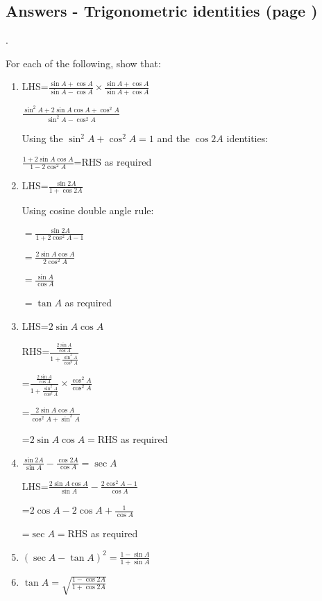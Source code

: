 \documentclass[../main.tex]{subfiles}
\begin{document}
\subsection*{Answers - Trigonometric identities (page \pageref{Trig identities})}
\label{Trig identities answers}.

For each of the following, show that:
\begin{enumerate}
    \item LHS=$\frac{\sin{A}+\cos{A}}{\sin{A}-\cos{A}}\times \frac{\sin{A}+\cos{A}}{\sin{A}+\cos{A}}$

    $\frac{\sin^2{A}+2\sin{A}\cos{A}+\cos^2{A}}{\sin^2{A}-\cos^2{A}}$

    Using the $\sin^2{A}+\cos^2{A}=1$ and the $\cos{2A}$ identities:

    $\frac{1+2\sin{A}\cos{A}}{1-2\cos^2{A}}$=RHS as required


    \item LHS=$\frac{\sin{2A}}{1+\cos{2A}}$

    Using cosine double angle rule:

    $=\frac{\sin{2A}}{1+2\cos^2{A}-1}$

    $=\frac{2\sin{A}\cos{A}}{2\cos^2{A}}$

    $=\frac{\sin{A}}{\cos{A}}$

    $=\tan{A}$ as required

    
    \item LHS=$2\sin{A}\cos{A}$

    RHS=$\frac{\frac{2\sin{A}}{\cos{A}}}{1+\frac{\sin^2{A}}{\cos^2{A}}}$

    =$\frac{\frac{2\sin{A}}{\cos{A}}}{1+\frac{\sin^2{A}}{\cos^2{A}}}\times \frac{\cos^2{A}}{\cos^2{A}}$

    =$\frac{2\sin{A}\cos{A}}{\cos^2{A}+\sin^2{A}}$

    =$2\sin{A}\cos{A}=$RHS as required

    \item $\frac{\sin{2A}}{\sin{A}}-\frac{\cos{2A}}{\cos{A}}=\sec{A}$
    
    LHS=$\frac{2\sin{A}\cos{A}}{\sin{A}}-\frac{2\cos^2{A}-1}{\cos{A}}$

    =$2\cos{A}-2\cos{A}+\frac{1}{\cos{A}}$

    =$\sec{A}=$RHS as required
    
    \item $(\sec{A}-\tan{A})^2=\frac{1-\sin{A}}{1+\sin{A}}$
    
    \item $\tan{A}=\sqrt{\frac{1-\cos{2A}}{1+\cos{2A}}}$


\end{enumerate}
\end{document}
